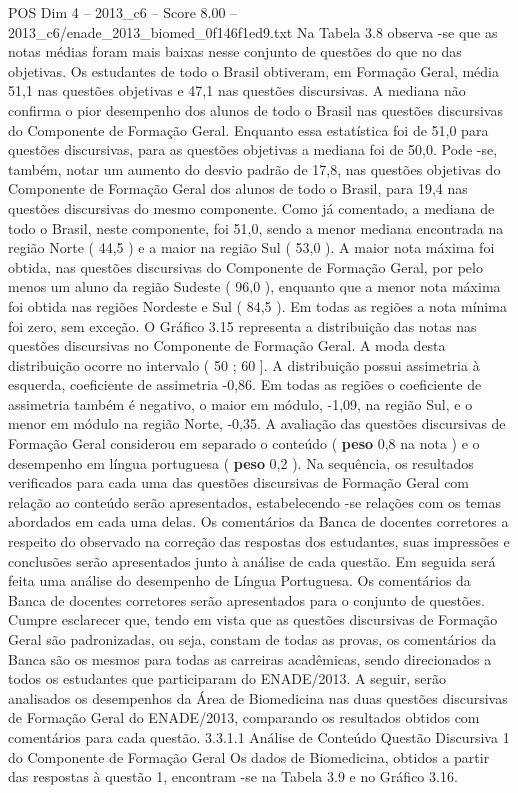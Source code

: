 \begin{textsample}{POS Dim 4 – 2013\_c6 – Score 8.00 – 2013\_c6/enade\_2013\_biomed\_0f146f1ed9.txt}
Na Tabela 3.8 observa -se que as notas médias foram mais baixas nesse conjunto de questões do que no das objetivas.
Os estudantes de todo o Brasil obtiveram, em Formação Geral, média 51,1 nas questões objetivas e 47,1 nas questões discursivas.
A mediana não confirma o pior desempenho dos alunos de todo o Brasil nas questões discursivas do Componente de Formação Geral.
Enquanto essa estatística foi de 51,0 para questões discursivas, para as questões objetivas a mediana foi de 50,0.
Pode -se, também, notar um aumento do desvio padrão de 17,8, nas questões objetivas do Componente de Formação Geral dos alunos de todo o Brasil, para 19,4 nas questões discursivas do mesmo componente.
Como já comentado, a mediana de todo o Brasil, neste componente, foi 51,0, sendo a menor mediana encontrada na região Norte ( 44,5 ) e a maior na região Sul ( 53,0 ).
A maior nota máxima foi obtida, nas questões discursivas do Componente de Formação Geral, por pelo menos um aluno da região Sudeste ( 96,0 ), enquanto que a menor nota máxima foi obtida nas regiões Nordeste e Sul ( 84,5 ).
Em todas as regiões a nota mínima foi zero, sem exceção.
O Gráfico 3.15 representa a distribuição das notas nas questões discursivas no Componente de Formação Geral.
A moda desta distribuição ocorre no intervalo ( 50 ; 60 ].
A distribuição possui assimetria à esquerda, coeficiente de assimetria -0,86.
Em todas as regiões o coeficiente de assimetria também é negativo, o maior em módulo, -1,09, na região Sul, e o menor em módulo na região Norte, -0,35.
A avaliação das questões discursivas de Formação Geral considerou em separado o conteúdo ( \textbf{peso} 0,8 na nota ) e o desempenho em língua portuguesa ( \textbf{peso} 0,2 ).
Na sequência, os resultados verificados para cada uma das questões discursivas de Formação Geral com relação ao conteúdo serão apresentados, estabelecendo -se relações com os temas abordados em cada uma delas.
Os comentários da Banca de docentes corretores a respeito do observado na correção das respostas dos estudantes, suas impressões e conclusões serão apresentados junto à análise de cada questão.
Em seguida será feita uma análise do desempenho de Língua Portuguesa.
Os comentários da Banca de docentes corretores serão apresentados para o conjunto de questões.
Cumpre esclarecer que, tendo em vista que as questões discursivas de Formação Geral são padronizadas, ou seja, constam de todas as provas, os comentários da Banca são os mesmos para todas as carreiras acadêmicas, sendo direcionados a todos os estudantes que participaram do ENADE/2013.
A seguir, serão analisados os desempenhos da Área de Biomedicina nas duas questões discursivas de Formação Geral do ENADE/2013, comparando os resultados obtidos com comentários para cada questão. 3.3.1.1 Análise de Conteúdo Questão Discursiva 1 do Componente de Formação Geral Os dados de Biomedicina, obtidos a partir das respostas à questão 1, encontram -se na Tabela 3.9 e no Gráfico 3.16.

\end{textsample}
